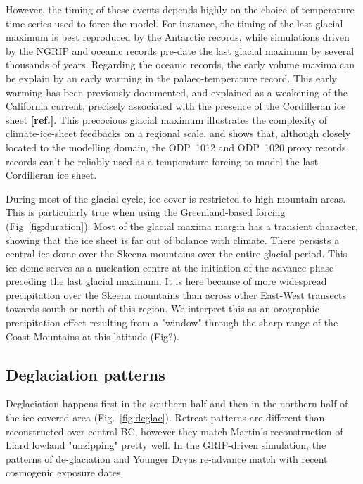 \documentclass[tc, ms]{copernicus}
\newcommand{\aref}[0]{\textbf{[ref.]}}
\begin{document}
However, the timing of these events depends highly on the choice of temperature
time-series used to force the model. For instance, the timing of the last
glacial maximum is best reproduced by the Antarctic records, while simulations
driven by the NGRIP and oceanic records pre-date the last glacial maximum by
several thousands of years. Regarding the oceanic records, the early volume
maxima can be explain by an early warming in the palaeo-temperature record.
This early warming has been previously documented, and explained as a
weakening of the California current, precisely associated with the presence of
the Cordilleran ice sheet \aref. This precocious glacial maximum illustrates
the complexity of climate-ice-sheet feedbacks on a regional scale, and shows
that, although closely located to the modelling domain, the ODP~1012 and
ODP~1020 proxy records records can't be reliably used as a temperature forcing
to model the last Cordilleran ice sheet.

During most of the glacial cycle, ice cover is restricted to high mountain
areas. This is particularly true when using the Greenland-based forcing
(Fig~\ref{fig:duration}). Most of the glacial maxima margin has a transient
character, showing that the ice sheet is far out of balance with climate. There
persists a central ice dome over the Skeena mountains over the entire glacial
period. This ice dome serves as a nucleation centre at the initiation of the
advance phase preceding the last glacial maximum. It is here because of more
widespread precipitation over the Skeena mountains than across other East-West
transects towards south or north of this region. We interpret this as an
orographic precipitation effect resulting from a "window" through the sharp
range of the Coast Mountains at this latitude (Fig?).

\subsection{Deglaciation patterns}

Deglaciation happens first in the southern half and then in the northern half
of the ice-covered area (Fig.~\ref{fig:deglac}). Retreat patterns are different
than reconstructed over central BC, however they match Martin's reconstruction
of Liard lowland "unzipping" pretty well. In the GRIP-driven simulation, the
patterns of de-glaciation and Younger Dryas re-advance match with recent
cosmogenic exposure dates.

\conclusions
\label{sec:concl}
\end{document}
